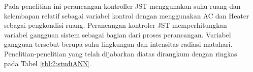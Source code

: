
Pada penelitian ini perancangan kontroller JST menggunakan suhu ruang dan kelembapan relatif sebagai variabel kontrol dengan menggunakan AC dan Heater sebagai pengkondisi ruang. Perancangan kontroler JST memperhitungkan variabel gangguan sistem sebagai bagian dari proses perancangan. Variabel gangguan tersebut berupa suhu lingkungan dan intensitas radiasi matahari. Penelitian-penelitian yang telah dijabarkan diatas dirangkum dengan ringkas pada Tabel \ref{tbl:2:studiANN}.

